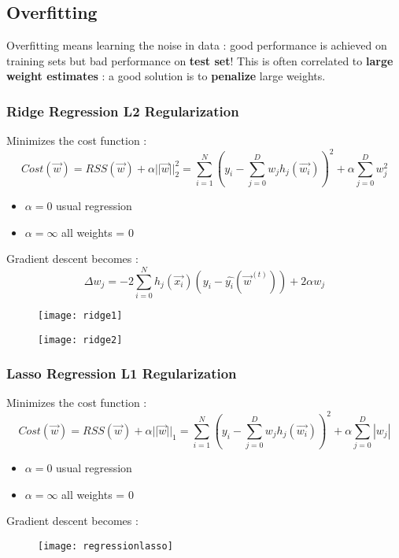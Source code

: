 \subsection{Overfitting}
Overfitting means learning the noise in data : good performance is achieved on training sets but bad performance on \textbf{test set}! This is often correlated to \textbf{large weight estimates} :  a good solution is to \textbf{penalize} large weights.

\subsubsection{Ridge Regression L2 Regularization}
Minimizes the cost function : 
$$ Cost(\overrightarrow{w}) = RSS(\overrightarrow{w})+ \alpha ||\overrightarrow{w}||^{2}_{2} = \sum \limits_{i=1}^{N} \left( y_i - \sum \limits_{j=0}^{D} w_jh_j(\overrightarrow{w_i}) \right)^2 + \alpha \sum \limits_{j=0}^{D}w^2_j$$
\begin{itemize}
\item $\alpha =0$ usual regression
\item $\alpha =\infty$ all weights = 0
\end{itemize}
Gradient descent becomes : 
$$ \Delta w_j= -2 \sum \limits_{i=0}^{N}h_j(\overrightarrow{x_i})(y_i- \hat{y_i}(\overrightarrow{w}^{(t)}))+2\alpha w_j$$
\begin{figure}[H]
  \centering
  \texttt{[image: ridge1]}
  \end{figure}
\begin{figure}[H]
  \centering
  \texttt{[image: ridge2]}
  \end{figure}

\subsubsection{Lasso Regression L1 Regularization}
Minimizes the cost function : 
$$ Cost(\overrightarrow{w}) = RSS(\overrightarrow{w})+ \alpha ||\overrightarrow{w}||_{1} = \sum \limits_{i=1}^{N} \left( y_i - \sum \limits_{j=0}^{D} w_jh_j(\overrightarrow{w_i}) \right)^2 + \alpha \sum \limits_{j=0}^{D}|w_j|$$
\begin{itemize}
\item $\alpha =0$ usual regression
\item $\alpha =\infty$ all weights = 0
\end{itemize}
Gradient descent becomes : 

\begin{figure}[H]
  \centering
  \texttt{[image: regressionlasso]}
  \end{figure}

